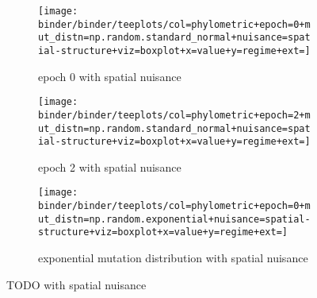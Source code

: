 \begin{figure*}
  \centering
  \begin{subfigure}[b]{\textwidth}
    \centering
    \texttt{[image: binder/binder/teeplots/col=phylometric+epoch=0+mut\_distn=np.random.standard\_normal+nuisance=spatial-structure+viz=boxplot+x=value+y=regime+ext=]}
    \caption{epoch 0 with spatial nuisance}
    \label{fig:perfect-tree-phylometrics-sensitivity-analysis-with-spatial-nuisance:epoch0}
  \end{subfigure}
  \begin{subfigure}[b]{\textwidth}
    \centering
    \texttt{[image: binder/binder/teeplots/col=phylometric+epoch=2+mut\_distn=np.random.standard\_normal+nuisance=spatial-structure+viz=boxplot+x=value+y=regime+ext=]}
    \caption{epoch 2 with spatial nuisance}
    \label{fig:perfect-tree-phylometrics-sensitivity-analysis-with-spatial-nuisance:epoch2}
  \end{subfigure}
  \begin{subfigure}[b]{\textwidth}
    \centering
    \texttt{[image: binder/binder/teeplots/col=phylometric+epoch=0+mut\_distn=np.random.exponential+nuisance=spatial-structure+viz=boxplot+x=value+y=regime+ext=]}
    \caption{exponential mutation distribution with spatial nuisance}
    \label{fig:perfect-tree-phylometrics-sensitivity-analysis-with-spatial-nuisance:exponential}
  \end{subfigure}
  \caption{TODO with spatial nuisance}
  \label{fig:perfect-tree-phylometrics-sensitivity-analysis-with-spatial-nuisance}
\end{figure*}
